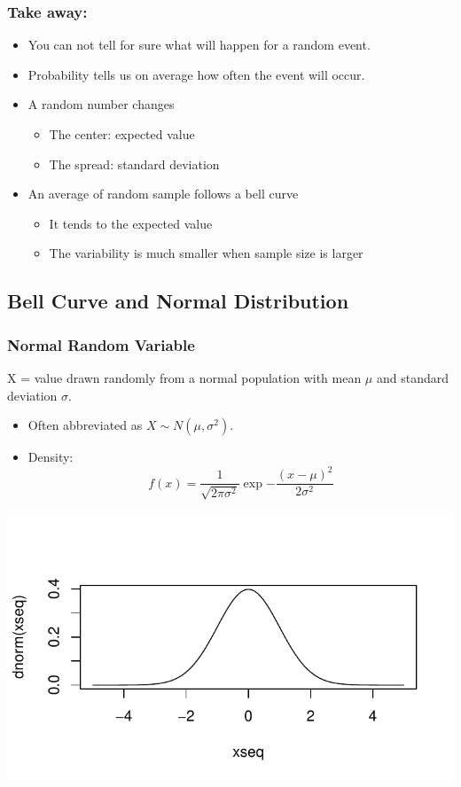 \documentclass[
  ignorenonframetext,
]{beamer}
\providecommand{\tightlist}{%
  \setlength{\itemsep}{0pt}\setlength{\parskip}{0pt}}
\begin{document}
\begin{frame}
\frametitle{Take away:}

\begin{itemize}
\item
  You can not tell for sure what will happen for a random event.
\item
  Probability tells us on average how often the event will occur.
\item
  A random number changes

  \begin{itemize}
  \tightlist
  \item
    The center: expected value
  \item
    The spread: standard deviation
  \end{itemize}
\item
  An average of random sample follows a bell curve

  \begin{itemize}
  \tightlist
  \item
    It tends to the expected value
  \item
    The variability is much smaller when sample size is larger
  \end{itemize}
\end{itemize}
\end{frame}

\hypertarget{bell-curve-and-normal-distribution}{%
\subsection{Bell Curve and Normal
Distribution}\label{bell-curve-and-normal-distribution}}

\begin{frame}
\frametitle{Normal Random Variable}

X = value drawn randomly from a normal population with mean \(\mu\) and
standard deviation \(\sigma\).

\begin{itemize}
\tightlist
\item
  Often abbreviated as \(X \sim N(\mu,\sigma^2)\).
\item
  Density: \[
  f(x) = \frac{1}{\sqrt{2\pi \sigma^2}} \exp{-\frac{(x-\mu)^2}{2\sigma^2}}
  \]
\end{itemize}

\begin{center}\includegraphics[width=0.7\linewidth]{Probability_Statistics_101_v2_files/figure-beamer/unnamed-chunk-15-1} \end{center}
\end{frame}
\end{document}
